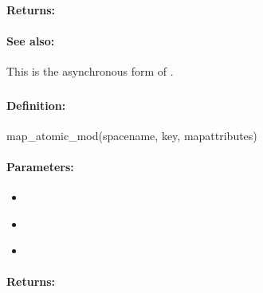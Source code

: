 \paragraph{Returns:}


\paragraph{See also:}  This is the asynchronous form of .

\pagebreak
\subsubsection{}
\label{api:ruby:map_atomic_mod}


\paragraph{Definition:}
\begin{rubycode}
map_atomic_mod(spacename, key, mapattributes)
\end{rubycode}

\paragraph{Parameters:}
\begin{itemize}[noitemsep]
\item {}\\

\item {}\\

\item {}\\

\end{itemize}

\paragraph{Returns:}


\pagebreak
\subsubsection{}
\label{api:ruby:async_map_atomic_mod}


